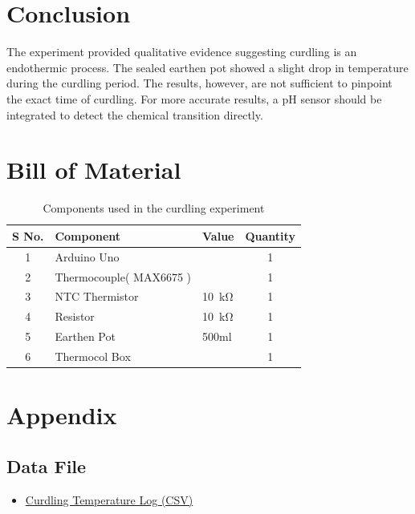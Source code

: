 \documentclass[12pt]{article}
\begin{document}
\section{Conclusion}
The experiment provided qualitative evidence suggesting curdling is an endothermic process. The sealed earthen pot showed a slight drop in temperature during the curdling period. The results, however, are not sufficient to pinpoint the exact time of curdling. For more accurate results, a pH sensor should be integrated to detect the chemical transition directly.

\section{Bill of Material}

\begin{table}[H]
\centering
\begin{tabular}{|c|l|l|c|}
\hline
\textbf{S No.} & \textbf{Component} & \textbf{Value} & \textbf{Quantity} \\ \hline
1  & Arduino Uno& & 1 \\
2 & Thermocouple( MAX6675 )& & 1\\
3 & NTC Thermistor & \SI{10}{\kilo\ohm} & 1\\
4 & Resistor & \SI{10}{\kilo\ohm} & 1 \\
5 & Earthen Pot & 500ml & 1  \\
6 & Thermocol Box & &  1  \\

\hline
\end{tabular}
\caption{Components used in the curdling experiment}
\end{table}

\section{Appendix}

\subsection*{Data File}

\begin{itemize}
  \item \href{https://drive.google.com/drive/folders/1yghCAIf9xUq-oj_R3DWdqhCwJgeraqwS?usp=sharing}{Curdling Temperature Log (CSV)}
\end{itemize}
\vspace{-5mm}
\end{document}
